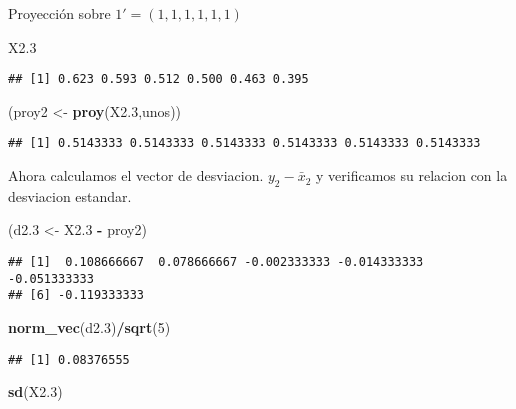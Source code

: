 \documentclass[]{article}
\newenvironment{Shaded}{\begin{snugshade}}{\end{snugshade}}
\newcommand{\DecValTok}[1]{\textcolor[rgb]{0.00,0.00,0.81}{#1}}
\newcommand{\FloatTok}[1]{\textcolor[rgb]{0.00,0.00,0.81}{#1}}
\newcommand{\KeywordTok}[1]{\textcolor[rgb]{0.13,0.29,0.53}{\textbf{#1}}}
\newcommand{\NormalTok}[1]{#1}
\newcommand{\OperatorTok}[1]{\textcolor[rgb]{0.81,0.36,0.00}{\textbf{#1}}}
\newcommand{\StringTok}[1]{\textcolor[rgb]{0.31,0.60,0.02}{#1}}
\begin{document}
Proyección sobre \(1' = (1,1,1,1,1,1)\)

\begin{Shaded}
\begin{Highlighting}[]
\NormalTok{X2}\FloatTok{.3}
\end{Highlighting}
\end{Shaded}

\begin{verbatim}
## [1] 0.623 0.593 0.512 0.500 0.463 0.395
\end{verbatim}

\begin{Shaded}
\begin{Highlighting}[]
\NormalTok{(proy2 <-}\StringTok{ }\KeywordTok{proy}\NormalTok{(X2}\FloatTok{.3}\NormalTok{,unos))}
\end{Highlighting}
\end{Shaded}

\begin{verbatim}
## [1] 0.5143333 0.5143333 0.5143333 0.5143333 0.5143333 0.5143333
\end{verbatim}

Ahora calculamos el vector de desviacion. \(y_2 - \bar{x}_2\) y
verificamos su relacion con la desviacion estandar.

\begin{Shaded}
\begin{Highlighting}[]
\NormalTok{(d2}\FloatTok{.3}\NormalTok{ <-}\StringTok{ }\NormalTok{X2}\FloatTok{.3} \OperatorTok{-}\StringTok{ }\NormalTok{proy2)}
\end{Highlighting}
\end{Shaded}

\begin{verbatim}
## [1]  0.108666667  0.078666667 -0.002333333 -0.014333333 -0.051333333
## [6] -0.119333333
\end{verbatim}

\begin{Shaded}
\begin{Highlighting}[]
\KeywordTok{norm_vec}\NormalTok{(d2}\FloatTok{.3}\NormalTok{)}\OperatorTok{/}\KeywordTok{sqrt}\NormalTok{(}\DecValTok{5}\NormalTok{)}
\end{Highlighting}
\end{Shaded}

\begin{verbatim}
## [1] 0.08376555
\end{verbatim}

\begin{Shaded}
\begin{Highlighting}[]
\KeywordTok{sd}\NormalTok{(X2}\FloatTok{.3}\NormalTok{)}
\end{Highlighting}
\end{Shaded}
\end{document}

